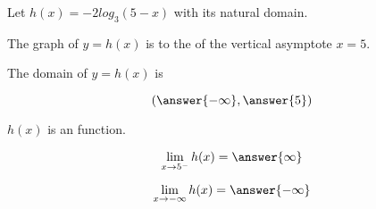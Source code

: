 \documentclass{ximera}
\author{Lee Wayand}
\begin{document}
\begin{exercise}






Let $h(x) = -2 log_3(5-x)$ with its natural domain. \\





\begin{question}


The graph of $y = h(x)$ is to the  of the vertical asymptote $x = 5$.


\end{question}





\begin{question}


The domain of $y = h(x)$ is 

\[
\left( \answer{-\infty}, \answer{5} \right)
\]


\end{question}






\begin{question}


$h(x)$ is an  function.


\end{question}











\begin{question}


\[
\lim\limits_{x \to 5^-} h(x) = \answer{\infty}
\]


\end{question}








\begin{question}


\[
\lim\limits_{x \to -\infty} h(x) = \answer{-\infty}
\]


\end{question}










\end{exercise}
\end{document}
